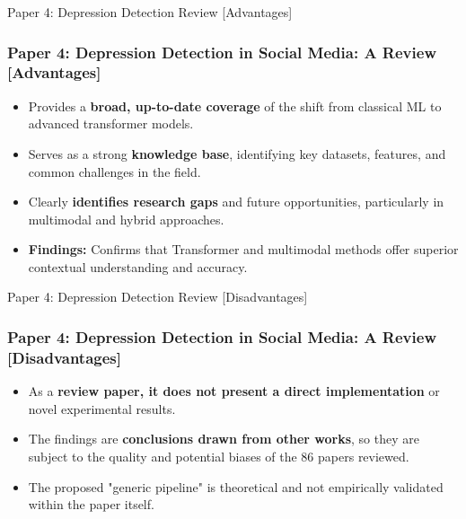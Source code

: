 \documentclass[11pt]{beamer}
\begin{document}
\begin{frame}{Paper 4: Depression Detection Review [Advantages]}
\frametitle{Paper 4: Depression Detection in Social Media: A Review [Advantages]}
\begin{itemize}
    \item Provides a \textbf{broad, up-to-date coverage} of the shift from classical ML to advanced transformer models.
    \item Serves as a strong \textbf{knowledge base}, identifying key datasets, features, and common challenges in the field.
    \item Clearly \textbf{identifies research gaps} and future opportunities, particularly in multimodal and hybrid approaches.
    \item \textbf{Findings:} Confirms that Transformer and multimodal methods offer superior contextual understanding and accuracy.
\end{itemize}
\end{frame}

\begin{frame}{Paper 4: Depression Detection Review [Disadvantages]}
\frametitle{Paper 4: Depression Detection in Social Media: A Review [Disadvantages]}
\begin{itemize}
    \item As a \textbf{review paper, it does not present a direct implementation} or novel experimental results.
    \item The findings are \textbf{conclusions drawn from other works}, so they are subject to the quality and potential biases of the 86 papers reviewed.
    \item The proposed "generic pipeline" is theoretical and not empirically validated within the paper itself.
\end{itemize}
\end{frame}
\end{document}
